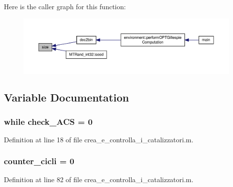 Here is the caller graph for this function\-:\nopagebreak
\begin{figure}[H]
\begin{center}
\leavevmode
\includegraphics[width=350pt]{a00056_ae113ea7f9e515a12ac4b5595c6faf61e_icgraph}
\end{center}
\end{figure}




\subsection{Variable Documentation}
\hypertarget{a00056_a516aa1002f0c1375a671e40ee7b79e07}{
\subsubsection[{check\-\_\-\-A\-C\-S}]{\setlength{\rightskip}{0pt plus 5cm}while check\-\_\-\-A\-C\-S = 0}}\label{a00056_a516aa1002f0c1375a671e40ee7b79e07}


Definition at line 18 of file crea\-\_\-e\-\_\-controlla\-\_\-i\-\_\-catalizzatori.\-m.

\hypertarget{a00056_a8b5c7ae18fb63e6cb42a3eac42f1f29e}{
\subsubsection[{counter\-\_\-cicli}]{\setlength{\rightskip}{0pt plus 5cm}counter\-\_\-cicli = 0}}\label{a00056_a8b5c7ae18fb63e6cb42a3eac42f1f29e}


Definition at line 82 of file crea\-\_\-e\-\_\-controlla\-\_\-i\-\_\-catalizzatori.\-m.

